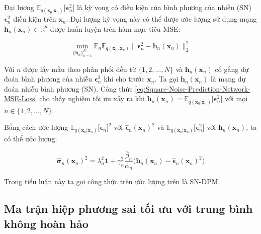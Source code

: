 \documentclass[14pt, a4paper]{article}
\numberwithin{equation}{section}
\numberwithin{figure}{section}
\numberwithin{dl}{section}
\numberwithin{md}{section}
\numberwithin{bd}{section}
\numberwithin{dn}{section}
\numberwithin{hq}{section}
\begin{document}
    Đại lượng $\mathbb{E}_{q(\boldsymbol{x}_0 \vert \boldsymbol{x}_n)} \lbrack \boldsymbol{\epsilon}_n^2 \rbrack$ là kỳ vọng có điều kiện của bình phương của nhiễu (SN) $\boldsymbol{\epsilon}_n^2$ điều kiện trên $\boldsymbol{x}_n$.
    Đại lượng kỳ vọng này có thể được ước lượng sử dụng mạng $\boldsymbol{h}_n (\boldsymbol{x}_n) \in \mathbb{R}^d$ được huấn luyện trên hàm mục tiêu MSE:

    \begin{equation} \label{eq:Square-Noise-Prediction-Network-MSE-Loss}
        \min_{\lbrace \boldsymbol{h}_n \rbrace_{n=1}^N} \mathbb{E}_n \mathbb{E}_{q(\boldsymbol{x}_0, \boldsymbol{x}_n)} \lVert \boldsymbol{\epsilon}_n^2 - \boldsymbol{h}_n (\boldsymbol{x}_n) \rVert_2^2
    \end{equation}

    Với $n$ được lấy mẫu theo phân phối đều từ $\lbrace 1, 2, \dots, N \rbrace$ và $\boldsymbol{h}_n (\boldsymbol{x}_n)$ cố gắng dự đoán bình phương của nhiễu $\boldsymbol{\epsilon}_n^2$ khi cho trước $\boldsymbol{x}_n$.
    Ta gọi $\boldsymbol{h}_n (\boldsymbol{x}_n)$ là mạng dự đoán nhiễu bình phương (SN).
    Công thức \ref{eq:Square-Noise-Prediction-Network-MSE-Loss} cho thấy nghiệm tối ưu xảy ra khi $\boldsymbol{h}_n (\boldsymbol{x}_n) = \mathbb{E}_{q(\boldsymbol{x}_0 \vert \boldsymbol{x}_n)} \lbrack \boldsymbol{\epsilon}_n^2 \rbrack$ với mọi $n \in \lbrace 1, 2, \dots, N \rbrace$.

    Bằng cách ước lượng $\mathbb{E}_{q(\boldsymbol{x}_0 \vert \boldsymbol{x}_n)} \lbrack \boldsymbol{\epsilon}_n \rbrack^2$ với $\hat{\boldsymbol{\epsilon}}_n (\boldsymbol{x}_n)^2$ và $\mathbb{E}_{q(\boldsymbol{x}_0 \vert \boldsymbol{x}_n)} \lbrack \boldsymbol{\epsilon}_n^2 \rbrack$ với $\boldsymbol{h}_n (\boldsymbol{x}_n)$,
    ta có thể ước lượng:

    \begin{equation} \label{eq:Sigma-SN-SPM}
        \hat{\boldsymbol{\sigma}}_n (\boldsymbol{x}_n)^2 = \lambda_n^2 \boldsymbol{1} + \gamma_n^2 \dfrac{\overline{\beta}_n}{\overline{\alpha}_n} \big( \boldsymbol{h}_n (\boldsymbol{x}_n) - \hat{\boldsymbol{\epsilon}}_n (\boldsymbol{x}_n)^2 \big)
    \end{equation}

    Trong tiểu luận này ta gọi công thức trên ước lượng trên là SN-DPM.

    \subsection{Ma trận hiệp phương sai tối ưu với trung bình không hoàn hảo}
\end{document}
